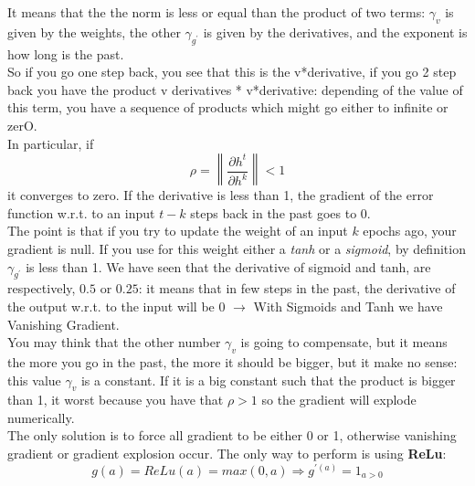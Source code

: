 It means that the the norm is less or equal than the product of two terms: $\gamma_v$ is given by the weights, the other  $\gamma_{g^{\prime}}$ is given by the derivatives, and the exponent is how long is the past. \\
So if you go one step back, you see that this is the v*derivative, if you go 2 step back you have the product v derivatives * v*derivative: depending of the value of this term, you have a sequence of products which might go either to infinite or zerO. \\
In particular, if 
$$ \rho = \left\|\frac{\partial h^{t}}{\partial h^{k}}\right\| < 1$$
it converges to zero.
If the derivative is less than 1, the gradient of the error function w.r.t. to an input $t-k$ steps back in the past goes to 0. \\
The point is that if you try to update the weight of an input $k$ epochs ago, your gradient is null. If you use for this weight either a \textit{tanh} or a \textit{sigmoid}, by definition $\gamma_{g^{\prime}}$ is less than 1. We have seen that the derivative of sigmoid and tanh, are respectively, $0.5$ or $0.25$: it means that in few steps in the past, the derivative of the output w.r.t. to the input will be 0 $\rightarrow$ With Sigmoids and Tanh we have Vanishing Gradient. \\
You may think that the other number $\gamma_{v}$ is going to compensate, but it means the more you go in the past, the more it should be bigger, but it make no sense: this value $\gamma_{v}$ is a constant. If it is a big constant such that the product is bigger than 1, it worst because you have that
$\rho > 1$
so the gradient will explode numerically. \\

The only solution is to force all gradient to be either 0 or 1, otherwise vanishing gradient or gradient explosion occur. 
The only way to perform is using \textbf{ReLu}: 
$$g(a) = ReLu(a) = max(0,a) \Rightarrow g^{\prime (a)} = 1_{a>0}$$ 

